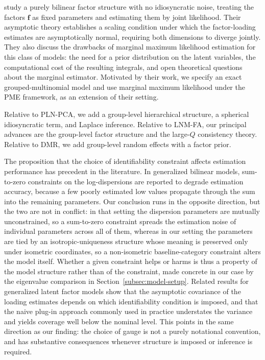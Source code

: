 \citet{Cui2026} study a purely bilinear factor structure with no idiosyncratic noise, treating the factors $\mathbf{f}$ as fixed parameters and estimating them by joint likelihood. Their asymptotic theory establishes a scaling condition under which the factor-loading estimates are asymptotically normal, requiring both dimensions to diverge jointly. They also discuss the drawbacks of marginal maximum likelihood estimation for this class of models: the need for a prior distribution on the latent variables, the computational cost of the resulting integrals, and open theoretical questions about the marginal estimator. Motivated by their work, we specify an exact grouped-multinomial model and use marginal maximum likelihood under the PME framework, as an extension of their setting.

Relative to PLN-PCA, we add a group-level hierarchical structure, a spherical idiosyncratic term, and Laplace inference. Relative to LNM-FA, our principal advances are the group-level factor structure and the large-$Q$ consistency theory. Relative to DMR, we add group-level random effects with a factor prior.

The proposition that the choice of identifiability constraint affects estimation performance has precedent in the literature. In generalized bilinear models, sum-to-zero constraints on the log-dispersions are reported to degrade estimation accuracy, because a few poorly estimated low values propagate through the sum into the remaining parameters. Our conclusion runs in the opposite direction, but the two are not in conflict: in that setting the dispersion parameters are mutually unconstrained, so a sum-to-zero constraint spreads the estimation noise of individual parameters across all of them, whereas in our setting the parameters are tied by an isotropic-uniqueness structure whose meaning is preserved only under isometric coordinates, so a non-isometric baseline-category constraint alters the model itself. Whether a given constraint helps or harms is thus a property of the model structure rather than of the constraint, made concrete in our case by the eigenvalue comparison in Section~\ref{subsec:model-setup}. Related results for generalized latent factor models show that the asymptotic covariance of the loading estimates depends on which identifiability condition is imposed, and that the naive plug-in approach commonly used in practice understates the variance and yields coverage well below the nominal level. This points in the same direction as our finding: the choice of gauge is not a purely notational convention, and has substantive consequences whenever structure is imposed or inference is required.

